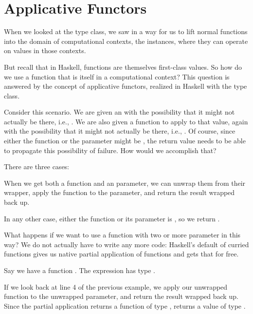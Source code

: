 \section{Applicative Functors}

When we looked at the  type class, we saw in  a way for us to lift
normal functions into the domain of computational contexts, the  instances, where
they can operate on values in those contexts.

But recall that in Haskell, functions are themselves first-class values. So how do we use a function
that is itself in a computational context? This question is answered by the concept of applicative
functors, realized in Haskell with the  type class.

Consider this scenario. We are given an  with the possibility that it might not
actually be there, i.e., . We are also given a function to apply to that value,
again with the possibility that it might not actually be there, i.e., .
Of course, since either the function or the parameter might be , the return value needs
to be able to propagate this possibility of failure. How would we accomplish that?



There are three cases:

\begin{notelist}
    \item When we get both  a function and an parameter, we can unwrap them from their  wrapper,
          apply the function to the parameter, and return the result wrapped back up.
    \item In any other case, either the function or its parameter is , so we return .
\end{notelist}

What happens if we want to use a function with two or more parameter in this way? We do not actually have to write any more
code: Haskell's default of curried functions gives us native partial application of functions and 
gets that for free.

Say we have a function . The expression  has type .

If we look back at line 4 of the previous example, we apply our unwrapped function to the unwrapped parameter, and return the
result wrapped back up. Since the partial application  returns a function of type , 
 returns a value of type . 

